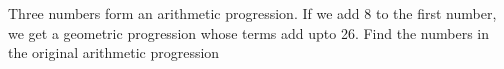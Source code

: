 
%
%
%
%
% 
% 

\question[5] Three numbers form an arithmetic progression. If we add 8 to the first number,
 we get a geometric progression whose terms add upto 26. Find the numbers in the original 
 arithmetic progression


\ifprintanswers
\fi 

